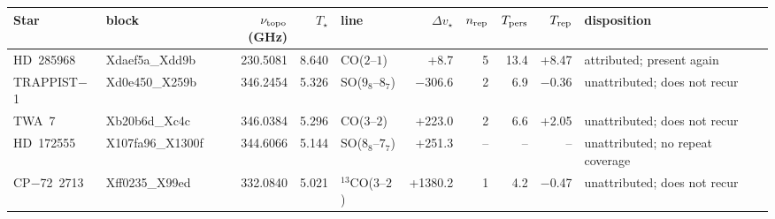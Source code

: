 \begin{tabular}{@{}l@{~}l@{~}r@{~}r@{~}l@{~}r@{~~}r@{~}r@{~}r@{~}l@{}}
\hline
Star & block & $\nu_{\rm topo}$ (GHz) & $T_\star$ & line & $\Delta v_\star$ & $n_{\rm rep}$ & $T_{\rm pers}$ & $T_{\rm rep}$ & disposition \\
\hline
HD~285968 & Xdaef5a\_Xdd9b & 230.5081 & 8.640 & CO($2$--$1$) & +8.7 & 5 & 13.4 & +8.47 & attributed; present again \\
TRAPPIST$-$1 & Xd0e450\_X259b & 346.2454 & 5.326 & SO($9_{8}$--$8_{7}$) & \ensuremath{-}306.6 & 2 & 6.9 & \ensuremath{-}0.36 & unattributed; does not recur \\
TWA~7 & Xb20b6d\_Xc4c & 346.0384 & 5.296 & CO($3$--$2$) & +223.0 & 2 & 6.6 & +2.05 & unattributed; does not recur \\
HD~172555 & X107fa96\_X1300f & 344.6066 & 5.144 & SO($8_{8}$--$7_{7}$) & +251.3 & -- & -- & -- & unattributed; no repeat coverage \\
CP$-$72~2713 & Xff0235\_X99ed & 332.0840 & 5.021 & $^{13}$CO($3$--$2$) & +1380.2 & 1 & 4.2 & \ensuremath{-}0.47 & unattributed; does not recur \\
\hline
\end{tabular}

